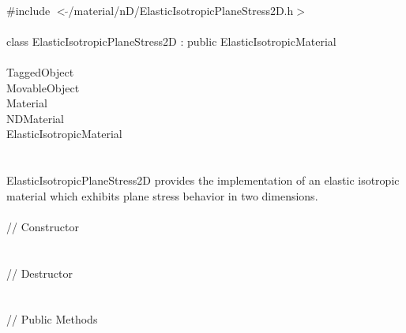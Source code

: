 
   \\
\indent \#include $<\tilde{ }$/material/nD/ElasticIsotropicPlaneStress2D.h$>$  \\

  \\
\indent class ElasticIsotropicPlaneStress2D : public ElasticIsotropicMaterial \\

 \\
\indent TaggedObject \\
\indent MovableObject \\
\indent\indent Material \\
\indent\indent\indent NDMaterial \\
\indent\indent\indent\indent ElasticIsotropicMaterial \\
\indent\indent\indent\indent{} \\

  \\
ElasticIsotropicPlaneStress2D provides the implementation of an
elastic isotropic material which exhibits plane stress behavior in two
dimensions. \\

 \\
\indent // Constructor \\
  \\ \\
\indent // Destructor \\
\\ \\
\indent // Public Methods \\
 \\
 \\
 \\
 \\
 \\
 \\
 \\

